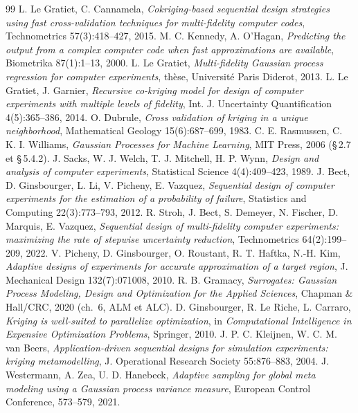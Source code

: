 \documentclass[10pt,a4paper]{article}
\theoremstyle{plain}
\begin{document}
{\small
\begin{thebibliography}{99}\setlength{\itemsep}{0.05em}
 L. Le Gratiet, C. Cannamela, \emph{Cokriging-based sequential design strategies using fast
  cross-validation techniques for multi-fidelity computer codes}, Technometrics 57(3):418–427, 2015.
 M. C. Kennedy, A. O'Hagan, \emph{Predicting the output from a complex computer code when fast
  approximations are available}, Biometrika 87(1):1–13, 2000.
 L. Le Gratiet, \emph{Multi-fidelity Gaussian process regression for computer experiments},
  thèse, Université Paris Diderot, 2013.
 L. Le Gratiet, J. Garnier, \emph{Recursive co-kriging model for design of computer experiments
  with multiple levels of fidelity}, Int. J. Uncertainty Quantification 4(5):365–386, 2014.
 O. Dubrule, \emph{Cross validation of kriging in a unique neighborhood}, Mathematical Geology
  15(6):687–699, 1983.
 C. E. Rasmussen, C. K. I. Williams, \emph{Gaussian Processes for Machine Learning}, MIT Press,
  2006 (§\,2.7 et §\,5.4.2).
 J. Sacks, W. J. Welch, T. J. Mitchell, H. P. Wynn, \emph{Design and analysis of computer
  experiments}, Statistical Science 4(4):409–423, 1989.
 J. Bect, D. Ginsbourger, L. Li, V. Picheny, E. Vazquez, \emph{Sequential design of computer
  experiments for the estimation of a probability of failure}, Statistics and Computing 22(3):773–793, 2012.
 R. Stroh, J. Bect, S. Demeyer, N. Fischer, D. Marquis, E. Vazquez, \emph{Sequential design of
  multi-fidelity computer experiments: maximizing the rate of stepwise uncertainty reduction}, Technometrics
  64(2):199–209, 2022.
 V. Picheny, D. Ginsbourger, O. Roustant, R. T. Haftka, N.-H. Kim, \emph{Adaptive designs of
  experiments for accurate approximation of a target region}, J. Mechanical Design 132(7):071008, 2010.
 R. B. Gramacy, \emph{Surrogates: Gaussian Process Modeling, Design and Optimization for the
  Applied Sciences}, Chapman \& Hall/CRC, 2020 (ch.~6, ALM et ALC).
 D. Ginsbourger, R. Le Riche, L. Carraro, \emph{Kriging is well-suited to parallelize
  optimization}, in \emph{Computational Intelligence in Expensive Optimization Problems}, Springer, 2010.
 J. P. C. Kleijnen, W. C. M. van Beers, \emph{Application-driven sequential designs for
  simulation experiments: kriging metamodelling}, J. Operational Research Society 55:876–883, 2004.
 J. Westermann, A. Zea, U. D. Hanebeck, \emph{Adaptive sampling for global meta modeling using a
  Gaussian process variance measure}, European Control Conference, 573–579, 2021.
\end{thebibliography}}
\end{document}
